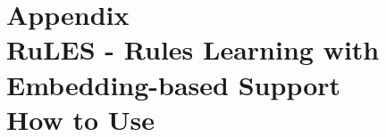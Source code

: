 \chapter{Appendix\\RuLES - Rules Learning with Embedding-based Support\\How to Use}
\label{chap:system}






